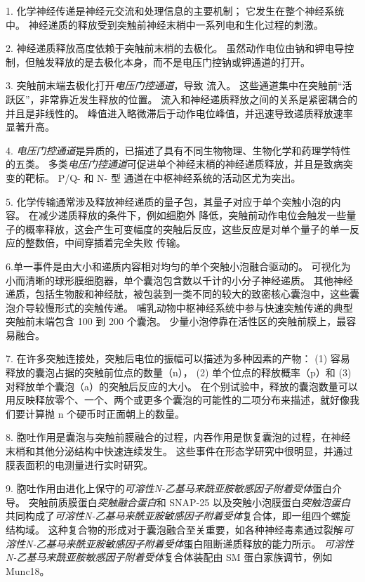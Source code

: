 1. 化学神经传递是神经元交流和处理信息的主要机制； 它发生在整个神经系统中。
神经递质的释放受到突触前神经末梢中一系列电和生化过程的刺激。 


2. 神经递质释放高度依赖于突触前末梢的去极化。
虽然动作电位由钠和钾电导控制，但触发释放的是去极化本身，而不是电压门控钠或钾通道的打开。 


3. 突触前末端去极化打开\textit{电压门控通道}，导致  流入。
这些通道集中在突触前“活跃区”，非常靠近发生释放的位置。
 流入和神经递质释放之间的关系是紧密耦合的并且是非线性的。
 峰值进入略微滞后于动作电位峰值，并迅速导致递质释放速率显著升高。 


4. \textit{电压门控通道}是异质的，已描述了具有不同生物物理、生物化学和药理学特性的五类。
多类\textit{电压门控通道}可促进单个神经末梢的神经递质释放，并且是致病突变的靶标。
P/Q- 和 N- 型  通道在中枢神经系统的活动区尤为突出。 


5. 化学传输通常涉及释放神经递质的量子包，其量子对应于单个突触小泡的内容。
在减少递质释放的条件下，例如细胞外  降低，突触前动作电位会触发一些量子的概率释放，这会产生可变幅度的突触后反应，这些反应是对单个量子的单一反应的整数倍，中间穿插着完全失败 传输。


6.单一事件是由大小和递质内容相对均匀的单个突触小泡融合驱动的。
可视化为小而清晰的球形膜细胞器，单个囊泡包含数以千计的小分子神经递质。
其他神经递质，包括生物胺和神经肽，被包装到一类不同的较大的致密核心囊泡中，这些囊泡介导较慢形式的突触传递。
哺乳动物中枢神经系统中参与快速突触传递的典型突触前末端包含 100 到 200 个囊泡。
少量小泡停靠在活性区的突触前膜上，最容易融合。


7. 在许多突触连接处，突触后电位的振幅可以描述为多种因素的产物：
(1) 容易释放的囊泡占据的突触前位点的数量（n），
(2) 单个位点的释放概率（p）和
(3) 对释放单个囊泡（a）的突触后反应的大小。
在个别试验中，释放的囊泡数量可以用反映释放零个、一个、两个或更多个囊泡的可能性的二项分布来描述，就好像我们要计算抛 n 个硬币时正面朝上的数量。 


8. 胞吐作用是囊泡与突触前膜融合的过程，内吞作用是恢复囊泡的过程，在神经末梢和其他分泌结构中快速连续发生。
这些事件在形态学研究中很明显，并通过膜表面积的电测量进行实时研究。 


9. 胞吐作用由进化上保守的\textit{可溶性N-乙基马来酰亚胺敏感因子附着受体}蛋白介导。
突触前质膜蛋白\textit{突触融合蛋白}和 SNAP-25 以及突触小泡膜蛋白\textit{突触泡蛋白}共同构成了\textit{可溶性N-乙基马来酰亚胺敏感因子附着受体}复合体，即一组四个螺旋结构域。
这种复合物的形成对于囊泡融合至关重要，如各种神经毒素通过裂解\textit{可溶性N-乙基马来酰亚胺敏感因子附着受体}蛋白阻断递质释放的能力所示。
\textit{可溶性N-乙基马来酰亚胺敏感因子附着受体}复合体装配由 SM 蛋白家族调节，例如 Munc18。 


